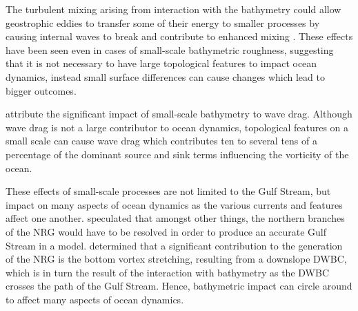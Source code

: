 \documentclass[..\report.tex]{subfiles}
\begin{document}

The turbulent mixing arising from interaction with the bathymetry could allow geostrophic eddies to transfer some of their energy to smaller processes by causing internal waves to break and contribute to enhanced mixing \citep{Nikurashin2012a}. These effects have been seen even in cases of small-scale bathymetric roughness, suggesting that it is not necessary to have large topological features to impact ocean dynamics, instead small surface differences can cause changes which lead to bigger outcomes.

\citet{NaveiraGarabato2013} attribute the significant impact of small-scale bathymetry to wave drag. Although wave drag is not a large contributor to ocean dynamics, topological features on a small scale can cause wave drag which contributes ten to several tens of a percentage of the dominant source and sink terms influencing the vorticity of the ocean.


These effects of small-scale processes are not limited to the Gulf Stream, but impact on many aspects of ocean dynamics as the various currents and features affect one another. 
\citet{Ezer2016b} speculated that amongst other things, the northern branches of the \gls{NRG} would have to be resolved in order to produce an accurate Gulf Stream in a model. \citet{Zhang2007} determined that a significant contribution to the generation of the \gls{NRG} is the bottom vortex stretching, resulting from a downslope \gls{DWBC}, which is in turn the result of the interaction with bathymetry as the \gls{DWBC} crosses the path of the Gulf Stream. Hence, bathymetric impact can circle around to affect many aspects of ocean dynamics.


\end{document}
